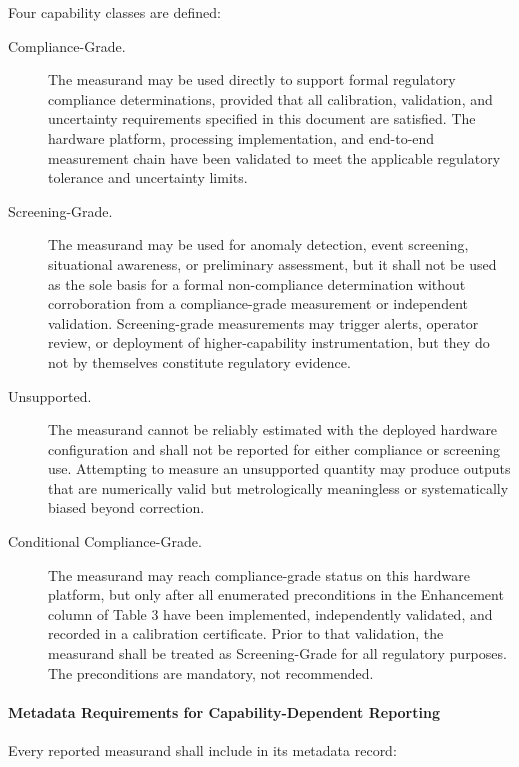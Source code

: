\documentclass[11pt]{report}
\begin{document}
Four capability classes are defined:

\begin{description}
	\item[Compliance-Grade.] The measurand may be used directly to support formal regulatory compliance determinations, provided that all calibration, validation, and uncertainty requirements specified in this document are satisfied. The hardware platform, processing implementation, and end-to-end measurement chain have been validated to meet the applicable regulatory tolerance and uncertainty limits.
	
	\item[Screening-Grade.] The measurand may be used for anomaly detection, event screening, situational awareness, or preliminary assessment, but it shall {not} be used as the sole basis for a formal non-compliance determination without corroboration from a compliance-grade measurement or independent validation. Screening-grade measurements may trigger alerts, operator review, or deployment of higher-capability instrumentation, but they do not by themselves constitute regulatory evidence.
	
	\item[Unsupported.] The measurand cannot be reliably estimated with the deployed hardware configuration and shall not be reported for either compliance or screening use. Attempting to measure an unsupported quantity may produce outputs that are numerically valid but metrologically meaningless or systematically biased beyond correction.
	
	\item[Conditional Compliance-Grade.] The measurand may reach compliance-grade status on this hardware platform, but only after all enumerated preconditions in the Enhancement column of Table 3 have been implemented, independently validated, and recorded in a calibration certificate. Prior to that validation, the measurand shall be treated as Screening-Grade for all regulatory purposes. The preconditions are mandatory, not recommended.
\end{description}

\paragraph*{Metadata Requirements for Capability-Dependent Reporting}\;

\noindent Every reported measurand shall include in its metadata record:
\end{document}
